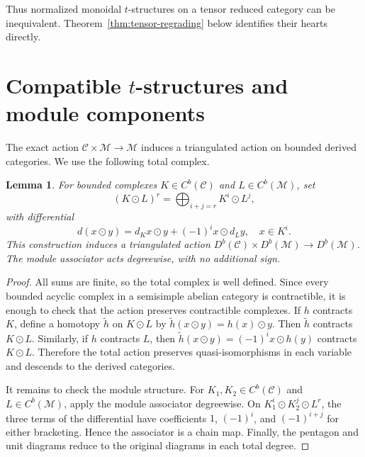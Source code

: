 \documentclass[11pt]{amsart}
\newcommand{\C}{\mathcal C}
\newcommand{\M}{\mathcal M}
\newtheorem{lemma}[theorem]{Lemma}
\theoremstyle{definition}
\theoremstyle{remark}
\theoremstyle{plain}
\begin{document}
Thus normalized monoidal $t$-structures on a tensor reduced category can be inequivalent. Theorem~\ref{thm:tensor-regrading} below identifies their hearts directly.

\section{Compatible \texorpdfstring{$t$}{t}-structures and module components}\label{sec:compatible-t-str}


The exact action $\C\times\M\to\M$ induces a triangulated action on bounded derived categories. We use the following total complex.

\begin{lemma}\label{lem:derived-action}
For bounded complexes $K\in C^b(\C)$ and $L\in C^b(\M)$, set
\[
(K\odot L)^r=\bigoplus_{i+j=r}K^i\odot L^j,
\]
with differential
\begin{equation}\label{eq:total-action-differential}
d(x\odot y)=d_Kx\odot y+(-1)^i x\odot d_Ly,\quad x\in K^i.
\end{equation}
This construction induces a triangulated action $D^b(\C)\times D^b(\M)\to D^b(\M)$. The module associator acts degreewise, with no additional sign.
\end{lemma}

\begin{proof}
All sums are finite, so the total complex is well defined. Since every bounded acyclic complex in a semisimple abelian category is contractible, it is enough to check that the action preserves contractible complexes. 
If $h$ contracts $K$, define a homotopy $\tilde h$ on $K\odot L$ by $\tilde{h}(x\odot y)=h(x)\odot y$. Then $\tilde{h}$ contracts $K\odot L$. Similarly, if $h$ contracts $L$, then $\tilde{h}(x\odot y)=(-1)^i x\odot h(y)$ contracts $K\odot L$. Therefore the total action preserves quasi-isomorphisms in each variable and descends to the derived categories.

It remains to check the module structure. For $K_1,K_2\in C^b(\C)$ and $L\in C^b(\M)$, apply the module associator degreewise. On $K_1^i\odot K_2^j\odot L^r$, the three terms of the differential have coefficients $1$, $(-1)^i$, and $(-1)^{i+j}$ for either bracketing. Hence the associator is a chain map. Finally, the pentagon and unit diagrams reduce to the original diagrams in each total degree.
\end{proof}
\end{document}
